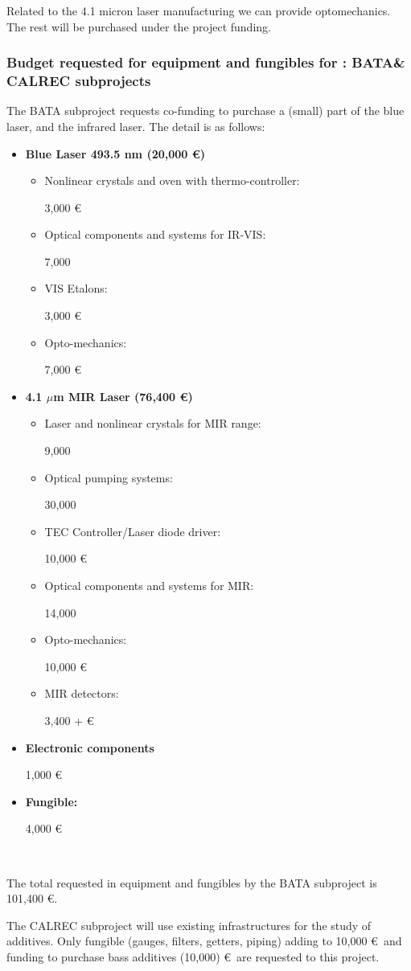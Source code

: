 Related to the 4.1 micron laser manufacturing we can provide optomechanics. The rest will be purchased under the project funding. 

\subsubsection*{Budget requested for equipment and fungibles for \BATA: BATA\& CALREC subprojects}

The BATA subproject requests co-funding to purchase a (small) part of the blue laser, and the infrared laser. The detail is as follows:

  \begin{itemize}
  \item \textbf{Blue Laser 493.5  nm  (20,000 \euro)}
  \begin{itemize}
\item Nonlinear crystals and oven with thermo-controller: {\raggedright 3,000 \euro } 
\item Optical components and systems for IR-VIS:  {\raggedright 7,000} 
\item VIS Etalons:  {\raggedright  3,000 \euro} 
\item Opto-mechanics:{ \raggedright 7,000  \euro} 
\end{itemize}

\item \textbf{4.1 $\mu$m MIR Laser (76,400 \euro)}
 \begin{itemize}
 \item Laser and nonlinear crystals for MIR range: { \raggedright  9,000 } 
\item Optical pumping systems: {\raggedright  30,000 } 
\item TEC Controller/Laser diode driver: {\raggedright   10,000  \euro} 
\item Optical components and systems for MIR: { \raggedright 14,000 }
\item Opto-mechanics: { \raggedright   10,000  \euro} 
\item MIR detectors:       {\raggedright  3,400 + \euro}
\end{itemize}
\item \textbf{Electronic components}                                                                                      {\bf \raggedright  1,000  \euro} 
\item \textbf{Fungible:}   {\bf \raggedright   4,000  \euro} \\
\end{itemize}

The total requested in equipment and fungibles by the BATA subproject is 101,400 \euro.

The CALREC subproject will use existing infrastructures for the study of additives. Only fungible (gauges, filters, getters, piping) adding to 10,000 \euro\ and funding to purchase bass additives (10,000) \euro\ are requested to this project. 